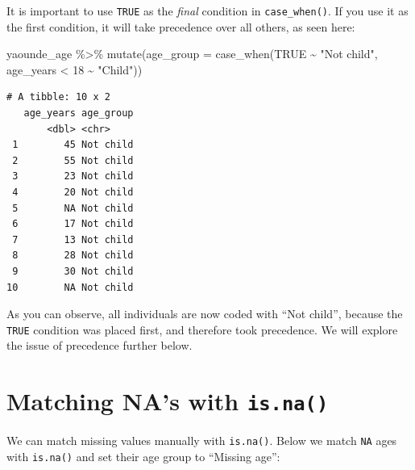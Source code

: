 \documentclass[
  letterpaper,
  DIV=11,
  numbers=noendperiod]{scrreprt}
\newenvironment{Shaded}{\begin{snugshade}}{\end{snugshade}}
\newcommand{\AttributeTok}[1]{\textcolor[rgb]{0.40,0.45,0.13}{#1}}
\newcommand{\ConstantTok}[1]{\textcolor[rgb]{0.56,0.35,0.01}{#1}}
\newcommand{\DecValTok}[1]{\textcolor[rgb]{0.68,0.00,0.00}{#1}}
\newcommand{\FunctionTok}[1]{\textcolor[rgb]{0.28,0.35,0.67}{#1}}
\newcommand{\NormalTok}[1]{\textcolor[rgb]{0.00,0.23,0.31}{#1}}
\newcommand{\SpecialCharTok}[1]{\textcolor[rgb]{0.37,0.37,0.37}{#1}}
\newcommand{\StringTok}[1]{\textcolor[rgb]{0.13,0.47,0.30}{#1}}
\begin{document}
\begin{tcolorbox}[enhanced jigsaw, title=\textcolor{quarto-callout-caution-color}{\faFire}\hspace{0.5em}{Watch Out}, colbacktitle=quarto-callout-caution-color!10!white, leftrule=.75mm, arc=.35mm, opacityback=0, bottomrule=.15mm, rightrule=.15mm, toptitle=1mm, breakable, toprule=.15mm, colback=white, coltitle=black, colframe=quarto-callout-caution-color-frame, bottomtitle=1mm, titlerule=0mm, left=2mm, opacitybacktitle=0.6]

It is important to use \texttt{TRUE} as the \emph{final} condition in
\texttt{case\_when()}. If you use it as the first condition, it will
take precedence over all others, as seen here:

\begin{Shaded}
\begin{Highlighting}[]
\NormalTok{yaounde\_age }\SpecialCharTok{\%\textgreater{}\%}
  \FunctionTok{mutate}\NormalTok{(}\AttributeTok{age\_group =} \FunctionTok{case\_when}\NormalTok{(}\ConstantTok{TRUE} \SpecialCharTok{\textasciitilde{}} \StringTok{"Not child"}\NormalTok{,}
\NormalTok{                               age\_years }\SpecialCharTok{\textless{}} \DecValTok{18} \SpecialCharTok{\textasciitilde{}} \StringTok{"Child"}\NormalTok{))}
\end{Highlighting}
\end{Shaded}

\begin{verbatim}
# A tibble: 10 x 2
   age_years age_group
       <dbl> <chr>    
 1        45 Not child
 2        55 Not child
 3        23 Not child
 4        20 Not child
 5        NA Not child
 6        17 Not child
 7        13 Not child
 8        28 Not child
 9        30 Not child
10        NA Not child
\end{verbatim}

As you can observe, all individuals are now coded with ``Not child'',
because the \texttt{TRUE} condition was placed first, and therefore took
precedence. We will explore the issue of precedence further below.

\end{tcolorbox}

\section{\texorpdfstring{Matching NA's with
\texttt{is.na()}}{Matching NA's with is.na()}}\label{matching-nas-with-is.na}

We can match missing values manually with \texttt{is.na()}. Below we
match \texttt{NA} ages with \texttt{is.na()} and set their age group to
``Missing age'':
\end{document}
